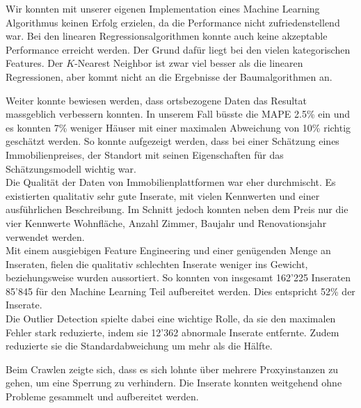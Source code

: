 Wir konnten mit unserer eigenen Implementation eines Machine Learning Algorithmus keinen Erfolg erzielen, da die Performance nicht zufriedenstellend war. Bei den linearen Regressionsalgorithmen konnte auch keine akzeptable Performance erreicht werden. Der Grund dafür liegt bei den vielen kategorischen Features. Der $K$-Nearest Neighbor ist zwar viel besser als die linearen Regressionen, aber kommt nicht an die Ergebnisse der Baumalgorithmen an.

Weiter konnte bewiesen werden, dass ortsbezogene Daten das Resultat massgeblich verbessern konnten. In unserem Fall büsste die MAPE 2.5\% ein und es konnten 7\% weniger Häuser mit einer maximalen Abweichung von 10\% richtig geschätzt werden. So konnte aufgezeigt werden, dass bei einer Schätzung eines Immobilienpreises, der Standort mit seinen Eigenschaften für das Schätzungsmodell wichtig war.\\[2ex]
%
Die Qualität der Daten von Immobilienplattformen war eher durchmischt. Es existierten qualitativ sehr gute Inserate, mit vielen Kennwerten und einer ausführlichen Beschreibung. Im Schnitt jedoch konnten neben dem Preis nur die vier Kennwerte Wohnfläche, Anzahl Zimmer, Baujahr und Renovationsjahr verwendet werden.\\
Mit einem ausgiebigen Feature Engineering und einer genügenden Menge an Inseraten, fielen die qualitativ schlechten Inserate weniger ins Gewicht, beziehungsweise wurden aussortiert.  So konnten von insgesamt 162’225 Inseraten 85’845 für den Machine Learning Teil aufbereitet werden. Dies entspricht 52\% der Inserate.\\
Die Outlier Detection spielte dabei eine wichtige Rolle, da sie den maximalen Fehler stark reduzierte, indem sie 12'362 abnormale Inserate entfernte. Zudem reduzierte sie die Standardabweichung um mehr als die Hälfte.

Beim Crawlen zeigte sich, dass es sich lohnte über mehrere Proxyinstanzen zu gehen, um eine Sperrung zu verhindern. Die Inserate konnten weitgehend ohne Probleme gesammelt und aufbereitet werden.
%
